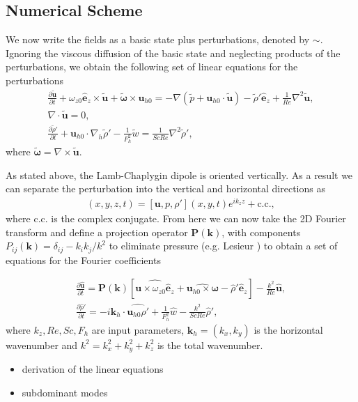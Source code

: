 \subsection{Numerical Scheme}
We now write the fields as a basic state plus perturbations, denoted by $\sim$. Ignoring the viscous diffusion of the basic state \cite{drazinreid} and neglecting products of the perturbations, we obtain the following set of linear equations for the perturbations
\begin{align}
\frac{\partial \tilde{\bm{u}}}{\partial t} + \omega_{z0}\hat{\bm{e}}_{z}\times \tilde{\bm{u}}+\tilde{\boldsymbol{\omega}}\times \bm{u}_{h0} = -\nabla(\tilde{p}+\bm{u}_{h0} \cdot \tilde{\bm{u}}) - \tilde{\rho}'\hat{\bm{e}}_{z} + \frac{1}{Re}\nabla^{2}\tilde{\bm{u}},\label{nsl1}\\
\nabla\cdot\tilde{\bm{u}}=0,\\
\frac{\partial \tilde{\rho}'}{\partial t} + \bm{u}_{h0}\cdot \nabla_{h}\tilde{\rho}'-\frac{1}{F_{h}^{2}}\tilde{w} = \frac{1}{ScRe}\nabla^{2}\tilde{\rho}',\label{nsl3}
\end{align}
where $\tilde{\boldsymbol{\omega}}=\nabla \times \tilde{\bm{u}}$.

As stated above, the Lamb-Chaplygin dipole is oriented vertically. As a result we can separate the perturbation into the vertical and horizontal directions as 
\begin{align} 
[\tilde{\bm{u}},\tilde{p},\tilde{\rho}'](x,y,z,t) = [\bm{u},p,\rho'](x,y,t)e^{ik_{z}z} + \text{c.c.},
\end{align}
where c.c. is the complex conjugate. From here we can now take the 2D Fourier transform and define a projection operator $\textbf{P}(\textbf{k})$, with components $P_{ij}(\textbf{k})=\delta_{ij} - k_{i}k_{j}/k^{2}$ to eliminate pressure (e.g. Lesieur \cite{lesieur}) to obtain a set of equations for the Fourier coefficients 

\begin{align}
\frac{\partial \hat{\bm{u}}}{\partial t} = \textbf{P}(\textbf{k})[\widehat{\bm{u}\times \omega_{z0}\hat{\bm{e}}_{z}} + \widehat{\bm{u}_{h0}\times\bm{\omega}}-\hat{\rho}'\hat{\bm{e}}_{z}] - \frac{k^{2}}{Re}\hat{\bm{u}},\label{solve1}\\
\frac{\partial\hat{\rho}'}{\partial t} = -i\bm{k}_{h}\cdot\widehat{\bm{u}_{h0}\rho'} + \frac{1}{F_{h}^{2}}\hat{w}- \frac{k^{2}}{ScRe}\hat{\rho}',\label{solve2}
\end{align}
where $k_{z},Re,Sc,F_{h}$ are input parameters, $\bm{k}_{h}=(k_{x},k_{y})$ is the horizontal wavenumber and $k^{2}=k_{x}^{2}+k_{y}^{2}+k_{z}^{2}$ is the total wavenumber. 
\begin{itemize}
	\item derivation of the linear equations
	\item subdominant modes
\end{itemize} 

